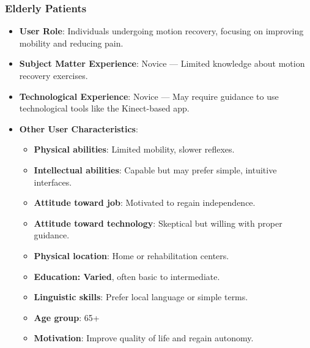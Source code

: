     \subsubsection{Elderly Patients}
        \begin{itemize}
            \item \textbf{User Role}: Individuals undergoing motion recovery, focusing on improving mobility and reducing pain.
            \item \textbf{Subject Matter Experience}: Novice --- Limited knowledge about motion recovery exercises.
            \item \textbf{Technological Experience}: Novice --- May require guidance to use technological tools like the Kinect-based app.
            \item \textbf{Other User Characteristics}:
            \begin{itemize}
                \item \textbf{Physical abilities}: Limited mobility, slower reflexes.
                \item \textbf{Intellectual abilities}: Capable but may prefer simple, intuitive interfaces.
                \item \textbf{Attitude toward job}: Motivated to regain independence.
                \item \textbf{Attitude toward technology}: Skeptical but willing with proper guidance.
                \item \textbf{Physical location}: Home or rehabilitation centers.
                \item \textbf{Education: Varied}, often basic to intermediate.
                \item \textbf{Linguistic skills}: Prefer local language or simple terms.
                \item \textbf{Age group}: 65+
                \item \textbf{Motivation}: Improve quality of life and regain autonomy.
            \end{itemize}
        \end{itemize}
        \clearpage
